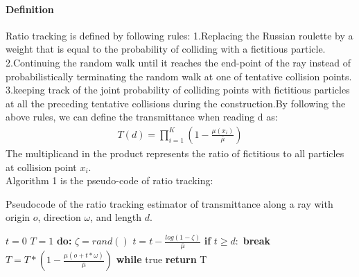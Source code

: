 \documentclass[acmtog]{acmart}
\begin{document}
\paragraph {\textbf{Definition}}
Ratio tracking is defined by following rules: 1.Replacing the Russian roulette by a weight that is equal to the probability of colliding with a fictitious particle. 2.Continuing the random walk until it reaches the end-point of the ray instead of probabilistically terminating the random walk at one of tentative collision points. 3.keeping track of the joint probability of colliding points with fictitious particles at all the preceding tentative collisions during the construction.By following the above rules, we can define the transmittance when reading d as:
\begin{equation}
	\begin{aligned}
	T(d)=\prod_{i=1}^{K}(1-\frac{\mu(x_{i})}{\bar{\mu}})
	\end{aligned}
\end{equation}
The multiplicand in the product represents the ratio of fictitious to all particles at collision point $x_i$.
\\Algorithm 1 is the pseudo-code of ratio tracking:
\begin{algorithm}[h]
	\caption{Pseudocode of the ratio tracking estimator of transmittance
		along a ray with origin $o$, direction $\omega$, and length $d$.}
	\begin{algorithmic}[1]
		\State $t=0$
		\State $T=1$
		\State \textbf{do:}
			\State  \qquad$\zeta=rand() $
			\State  \qquad$t=t-\frac{log(1-\zeta)}{\bar{\mu}} $
			\State  \qquad\textbf{if} $t\geq d:$ \textbf{break}
			\State  \qquad$T = T *(1-\frac{\mu(o+t*\omega)}{\bar{\mu}}) $
			\State \textbf{while} true
			\State \textbf{return} T
	\EndFunction  
\end{algorithmic}
\end{algorithm}\\
\end{document}
